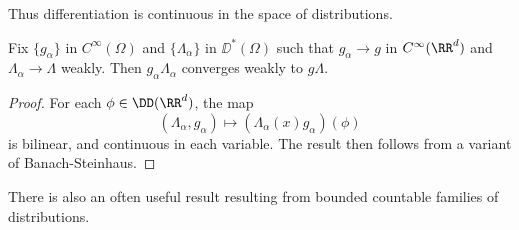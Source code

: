 Thus differentiation is continuous in the space of distributions.

\begin{theorem}
  Fix $\{ g_\alpha \}$ in $C^\infty(\Omega)$ and $\{ \Lambda_\alpha \}$ in $\DD^*(\Omega)$ such that $g_\alpha \to g$ in $C^\infty(\RR^d)$ and $\Lambda_\alpha \to \Lambda$ weakly. Then $g_\alpha \Lambda_\alpha$ converges weakly to $g \Lambda$.
\end{theorem}
\begin{proof}
  For each $\phi \in \DD(\RR^d)$, the map
  \[ (\Lambda_\alpha, g_\alpha) \mapsto (\Lambda_\alpha(x) g_\alpha)(\phi) \]
  is bilinear, and continuous in each variable. The result then follows from a variant of Banach-Steinhaus.
\end{proof}

There is also an often useful result resulting from bounded countable families of distributions.

